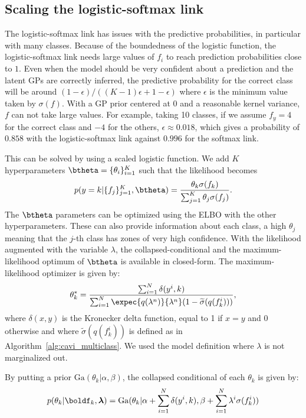 \subsection{Scaling the logistic-softmax link}
\label{sec:scale_multiclass}
The logistic-softmax link has issues with the predictive probabilities, in particular with many classes.
Because of the boundedness of the logistic function, the logistic-softmax link needs large values of $f_i$ to reach prediction probabilities close to $1$.
Even when the model should be very confident about a prediction and the latent \ac{GPs} are correctly inferred, the predictive probability for the correct class will be around $(1-\epsilon) / ((K - 1) \epsilon +  1 - \epsilon)$ where $\epsilon$ is the minimum value taken by $\sigma(f)$.
With a \ac{GP} prior centered at 0 and a reasonable kernel variance, $f$ can not take large values.
For example, taking 10 classes, if we assume $f_y=4$ for the correct class and $-4$ for the others, $\epsilon \approx 0.018$, which gives a probability of $0.858$ with the logistic-softmax link against $0.996$ for the softmax link.

This can be solved by using a scaled logistic function.
We add $K$ hyperparameters $\btheta=\{\theta_{i}\}_{i=1}^K$ such that the likelihood becomes
\begin{align*}
    p(y=k|\{f_j\}_{j=1}^K,\btheta) = \frac{\theta_k \sigma(f_k)}{\sum_{j=1}^K \theta_j \sigma(f_j)}.
\end{align*}
The $\btheta$ parameters can be optimized using the \ac{ELBO} with the other hyperparameters.
These can also provide information about each class, a high $\theta_j$ meaning that the $j$-th class has zones of very high confidence.
With the likelihood augmented with the variable $\lambda$, the collapsed-conditional and the maximum-likelihood optimum of $\btheta$ is available in closed-form.
The maximum-likelihood optimizer is given by:
\begin{align*}
    \theta^*_k = \frac{\sum_{i=1}^N \delta(y^i, k)}{\sum_{i=1}^N \expec{q(\lambda^n)}{\lambda^n}(1 - \widetilde{\sigma}(q(f_k^i)))},
\end{align*}
where $\delta(x,y)$ is the Kronecker delta function, equal to 1 if $x=y$ and 0 otherwise and where $\widetilde{\sigma}(q(f_k^i))$ is defined as in Algorithm~\ref{alg:cavi_multiclass}.
We used the model definition where $\lambda$ is not marginalized out.

By putting a prior $\mathrm{Ga}(\theta_k|\alpha,\beta)$, the collapsed conditional of each $\theta_k$ is given by:
\begin{align*}
    p(\theta_k|\boldf_k, \boldsymbol{\lambda}) = \mathrm{Ga}(\theta_k|\alpha + \sum_{i=1}^N\delta(y^i, k), \beta + \sum_{i=1}^N\lambda^i\sigma(f_k^i))
\end{align*}

